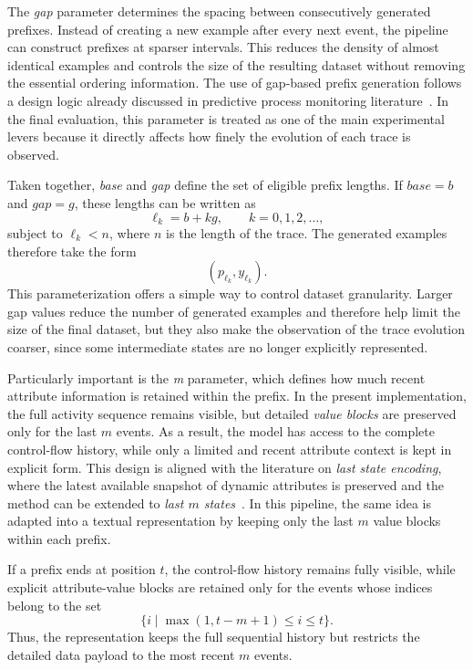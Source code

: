 \indent The \textit{gap} parameter determines the spacing between
consecutively generated prefixes. Instead of creating a new example after
every next event, the pipeline can construct prefixes at sparser intervals.
This reduces the density of almost identical examples and controls the size of
the resulting dataset without removing the essential ordering information. The
use of gap-based prefix generation follows a design logic already discussed in
predictive process monitoring literature~. In the
final evaluation, this parameter is treated as one of the main experimental
levers because it directly affects how finely the evolution of each trace is
observed.

\indent Taken together, \textit{base} and \textit{gap} define the set of
eligible prefix lengths. If \(\textit{base}=b\) and \(\textit{gap}=g\), these
lengths can be written as
\[
\ell_k = b + kg, \qquad k = 0,1,2,\dots,
\]
subject to \(\ell_k < n\), where \(n\) is the length of the trace. The
generated examples therefore take the form
\[
(p_{\ell_k}, y_{\ell_k}).
\]
This parameterization offers a simple way to control dataset granularity.
Larger gap values reduce the number of generated examples and therefore help
limit the size of the final dataset, but they also make the observation of the
trace evolution coarser, since some intermediate states are no longer
explicitly represented.

\indent Particularly important is the \textit{m} parameter, which defines how
much recent attribute information is retained within the prefix. In the
present implementation, the full activity sequence remains visible, but
detailed \textit{value blocks} are preserved only for the last \(m\) events.
As a result, the model has access to the complete control-flow history, while
only a limited and recent attribute context is kept in explicit form. This
design is aligned with the literature on \textit{last state encoding}, where
the latest available snapshot of dynamic attributes is preserved and the
method can be extended to \textit{last \(m\) states}~.
In this pipeline, the same idea is adapted into a textual representation by
keeping only the last \(m\) value blocks within each prefix.

\indent If a prefix ends at position \(t\), the control-flow history remains
fully visible, while explicit attribute-value blocks are retained only for the
events whose indices belong to the set
\[
\{i \mid \max(1, t-m+1) \leq i \leq t\}.
\]
Thus, the representation keeps the full sequential history but restricts the
detailed data payload to the most recent \(m\) events.

